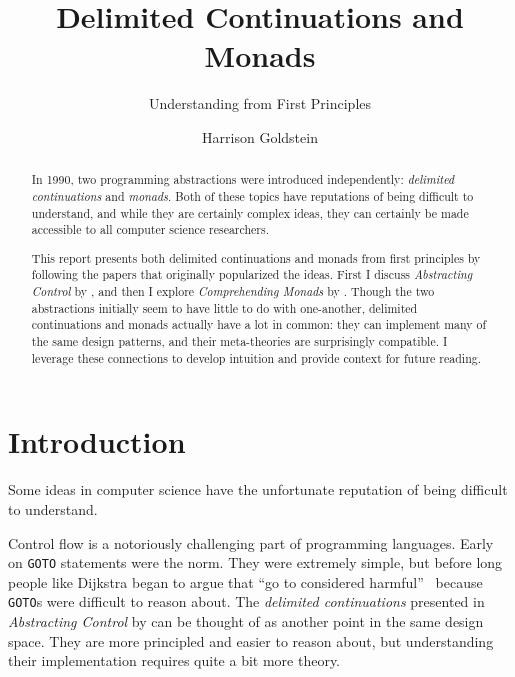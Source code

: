 \documentclass[acmsmall, nonacm, screen]{acmart}
\newif\ifdraft\drafttrue
\newcommand{\outline}[1]{
  \ifdraft
  {\color{red}{#1}}
  \fi
}
\begin{document}
\title{Delimited Continuations and Monads}
\subtitle{Understanding from First Principles}

\author{Harrison Goldstein}

\renewcommand{\shortauthors}{Goldstein}

\begin{abstract}
  In 1990, two programming abstractions were introduced independently: {\em delimited
  continuations} and {\em monads}. Both of these topics have reputations of being difficult to
  understand, and while they are certainly complex ideas, they can certainly be made accessible
  to all computer science researchers.
  
  This report presents both delimited continuations and monads from first principles by following
  the papers that originally popularized the ideas. First I discuss {\em Abstracting Control} by
  \citet{danvy1990abstracting}, and then I explore {\em Comprehending Monads} by
  \citet{wadler1990comprehending}. Though the two abstractions initially seem to have little to
  do with one-another, delimited continuations and monads actually have a lot in common: they can
  implement many of the same design patterns, and their meta-theories are surprisingly
  compatible. I leverage these connections to develop intuition and provide context for future
  reading.
\end{abstract}

\maketitle

\section{Introduction} \label{sec:introduction}
Some ideas in computer science have the unfortunate reputation of being difficult to understand.
\outline{more here}

Control flow is a notoriously challenging part of programming languages. Early on \texttt{GOTO}
statements were the norm. They were extremely simple, but before long people like Dijkstra began
to argue that ``go to considered harmful''~\cite{dijkstra1968letters} because \texttt{GOTO}s were
difficult to reason about. The {\em delimited continuations} presented in {\em Abstracting
Control} by \citet{danvy1990abstracting} can be thought of as another point in the same design
space. They are more principled and easier to reason about, but understanding their
implementation requires quite a bit more theory.
\end{document}
